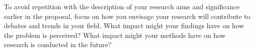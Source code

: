 \documentclass[12pt, a4paper]{article}
\begin{document}
To avoid repetition with the description of your research aims and significance earlier in the proposal, focus on how you envisage your research will contribute to debates and trends in your field. What impact might your findings have on how the problem is perceived? What impact might your methods have on how research is conducted in the future?




\end{document}
